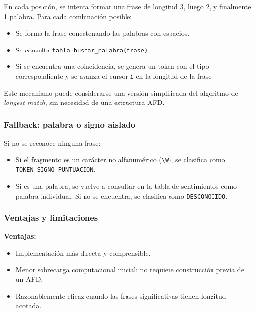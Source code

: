 En cada posición, se intenta formar una frase de longitud 3, luego 2, y finalmente 1 palabra.
Para cada combinación posible:

\begin{itemize}
	\item Se forma la frase concatenando las palabras con espacios.

	\item Se consulta \texttt{tabla.buscar\_palabra(frase)}.

	\item Si se encuentra una coincidencia, se genera un token con el tipo correspondiente y se
	      avanza el cursor \texttt{i} en la longitud de la frase.
\end{itemize}

Este mecanismo puede considerarse una versión simplificada del algoritmo de \textit{longest
	match}, sin necesidad de una estructura AFD.

\subsubsection{Fallback: palabra o signo aislado}

Si no se reconoce ninguna frase:

\begin{itemize}
	\item Si el fragmento es un carácter no alfanumérico (\texttt{\textbackslash W}), se
	      clasifica como \texttt{TOKEN\_SIGNO\_PUNTUACION}.

	\item Si es una palabra, se vuelve a consultar en la tabla de sentimientos como palabra
	      individual. Si no se encuentra, se clasifica como \texttt{DESCONOCIDO}.
\end{itemize}

\subsubsection{Ventajas y limitaciones}

\textbf{Ventajas:}

\begin{itemize}
	\item Implementación más directa y comprensible.
	\item Menor sobrecarga computacional inicial: no requiere construcción previa de un AFD.
	\item Razonablemente eficaz cuando las frases significativas tienen longitud acotada.
\end{itemize}

